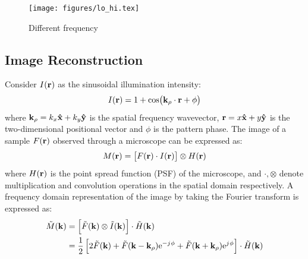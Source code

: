 \documentclass[11pt]{article}
\begin{document}
\begin{figure}[h]
  \begin{center}
    \noindent
    \texttt{[image: figures/lo\_hi.tex]}
    \caption{Different frequency}
    \label{fig:s_waves}
  \end{center}
\end{figure}
%
%
%
%
%
\subsection{Image Reconstruction}
%
Consider $I(\mathbf{r})$ as the sinusoidal illumination intensity:
%
\begin{equation}
  I(\mathbf{r}) = 1 + \cos(\mathbf{k}_{\rho} \cdot \mathbf{r} + \phi)
  \label{eq:intensity}
\end{equation}
where $\mathbf{k}_{\rho} = k_x \mathbf{\hat{x}} + k_y \mathbf{\hat{y}}$ is the spatial frequency wavevector,  $\mathbf{r} = x \mathbf{\hat{x}} +  y \mathbf{\hat{y}}$ is the two-dimensional positional vector and $\phi$ is the pattern phase. The image of a sample $F(\mathbf{r})$ observed through a microscope can be expressed as:
%
\begin{equation}
  M(\mathbf{r}) = \left[ F(\mathbf{r}) \cdot I(\mathbf{r}) \right] \otimes H(\mathbf{r})
  \label{eq:m_spatial_image}
\end{equation}
%
where $H(\mathbf{r})$ is the point spread function (PSF) of the microscope, and $\cdot, \otimes$ denote multiplication and convolution operations in the spatial domain respectively. A frequency domain representation of the image by taking the Fourier transform is expressed as:
%
\begin{equation}
  \begin{split}
    \tilde{M}(\mathbf{k}) &= \left[ \tilde{F}(\mathbf{k}) \otimes \tilde{I}(\mathbf{k}) \right] \cdot \tilde{H}(\mathbf{k}) \\
     &= \frac{1}{2} \left[ 2\tilde{F}(\mathbf{k}) + \tilde{F}(\mathbf{k} - \mathbf{k}_{\rho}) \mathrm{e}^{- j\mkern1mu \phi} + \tilde{F}(\mathbf{k} + \mathbf{k}_{\rho}) \mathrm{e}^{j\mkern1mu \phi} \right] \cdot \tilde{H}(\mathbf{k})
  \end{split}
  \label{eq:m_ft}
\end{equation}
\end{document}
